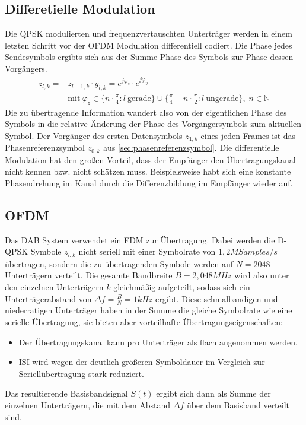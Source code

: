 \subsection{Differetielle Modulation}
\label{sec:diff_mod}
Die QPSK modulierten und frequenzvertauschten Unterträger werden in einem letzten Schritt vor der OFDM Modulation differentiell codiert. Die Phase jedes Sendesymbols ergibts sich aus der Summe Phase des Symbols zur Phase dessen Vorgängers.
\begin{equation}
\begin{aligned}
z_{l,k} = &z_{l-1,k}\cdot y_{l,k} = e^{j\varphi_z} \cdot e^{j\varphi_y} \\
&\text{mit} \: \varphi_z \in \{n \cdot \frac{\pi}{4}: l \: \text{gerade}\} \cup \{\frac{\pi}{4} + n \cdot \frac{\pi}{2}: l \: \text{ungerade}\}, \; n\in \mathbb{N} 
\end{aligned}
\end{equation}
Die zu übertragende Information wandert also von der eigentlichen Phase des Symbols in die relative Änderung der Phase des Vorgängersymbols zum aktuellen Symbol. Der Vorgänger des ersten Datensymbols $z_{1,k}$ eines jeden Frames ist das Phasenreferenzsymbol $z_{0,k}$ aus \ref{sec:phasenreferenzsymbol}. Die differentielle Modulation hat den großen Vorteil, dass der Empfänger den Übertragungskanal nicht kennen bzw. nicht schätzen muss. Beispielsweise habt sich eine konstante Phasendrehung im Kanal durch die Differenzbildung im Empfänger wieder auf.

\subsection{\ac{OFDM}}
\label{sec:ofdm}
Das DAB System verwendet ein \ac{FDM} zur Übertragung. Dabei werden die D-QPSK Symbole $z_{l,k}$ nicht seriell mit einer Symbolrate von $1,2 M Samples / s$ übertragen, sondern die zu übertragenden Symbole werden auf $N=2048$ Unterträgern verteilt. Die gesamte Bandbreite $B = 2,048 MHz$ wird also unter den einzelnen Unterträgern $k$ gleichmäßig aufgeteilt, sodass sich ein Unterträgerabstand von $\Delta f = \frac{B}{N} = 1kHz$ ergibt. Diese schmalbandigen und niederratigen Unterträger haben in der Summe die gleiche Symbolrate wie eine serielle Übertragung, sie bieten aber vorteilhafte Übertragungseigenschaften:
\begin{itemize}
\item Der Übertragungskanal kann pro Unterträger als flach angenommen werden.
\item \ac{ISI} wird wegen der deutlich größeren Symboldauer im Vergleich zur Seriellübertragung stark reduziert.
\end{itemize}
Das resultierende Basisbandsignal $S(t)$ ergibt sich dann als Summe der einzelnen Unterträgern, die mit dem Abstand $\Delta f$ über dem Basisband verteilt sind.

